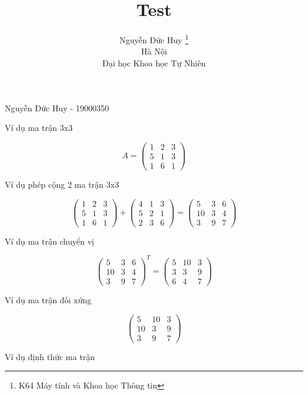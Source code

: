 \documentclass[12pt]{article}
\title{Test}
\author{
    Nguyễn Đức Huy \thanks{K64 Máy tính và Khoa học Thông tin}\\
    Hà Nội \\
    Đại học Khoa học Tự Nhiên
}
\begin{document}

Nguyễn Đức Huy - 19000350

Ví dụ ma trận 3x3

$$ A =  \begin{pmatrix}
        1 & 2 & 3 \\
        5 & 1 & 3 \\
        1 & 6 & 1
    \end{pmatrix}  $$

Ví dụ phép cộng 2 ma trận 3x3

$$ \begin{pmatrix}
        1 & 2 & 3 \\
        5 & 1 & 3 \\
        1 & 6 & 1
    \end{pmatrix} +  \begin{pmatrix}
        4 & 1 & 3 \\
        5 & 2 & 1 \\
        2 & 3 & 6
    \end{pmatrix} =  \begin{pmatrix}
        5  & 3 & 6 \\
        10 & 3 & 4 \\
        3  & 9 & 7
    \end{pmatrix} $$

Ví dụ ma trận chuyển vị

$$ \begin{pmatrix}
        5  & 3 & 6 \\
        10 & 3 & 4 \\
        3  & 9 & 7
    \end{pmatrix}^T =  \begin{pmatrix}
        5 & 10 & 3 \\
        3 & 3  & 9 \\
        6 & 4  & 7
    \end{pmatrix} $$

Ví dụ ma trận đối xứng

$$ \begin{pmatrix}
        5  & 10 & 3 \\
        10 & 3  & 9 \\
        3  & 9  & 7
    \end{pmatrix} $$

Ví dụ định thức ma trận
\end{document}
